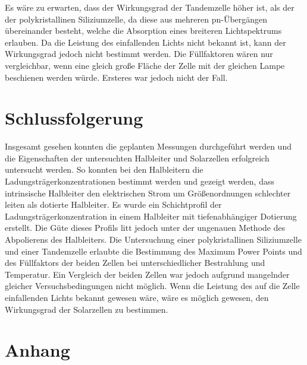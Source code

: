 \documentclass[
	a4paper,
	12pt,
	pagesize,
	ngerman
]{scrartcl}
\begin{document}
	Es wäre zu erwarten, dass der Wirkungsgrad der Tandemzelle höher ist, als der der polykristallinen Siliziumzelle, da diese aus mehreren pn-Übergängen übereinander besteht, welche die Absorption eines breiteren Lichtspektrums erlauben.
	Da die Leistung des einfallenden Lichts nicht bekannt ist, kann der Wirkungsgrad jedoch nicht bestimmt werden.
	Die Füllfaktoren wären nur vergleichbar, wenn eine gleich große Fläche der Zelle mit der gleichen Lampe beschienen werden würde.
	Ersteres war jedoch nicht der Fall.



	\section{Schlussfolgerung}
	Insgesamt gesehen konnten die geplanten Messungen durchgeführt werden und die Eigenschaften der untersuchten Halbleiter und Solarzellen erfolgreich untersucht werden.
	So konnten bei den Halbleitern die Ladungsträgerkonzentrationen bestimmt werden und gezeigt werden, dass intrinsische Halbleiter den elektrischen Strom um Größenordnungen schlechter leiten als dotierte Halbleiter.
	Es wurde ein Schichtprofil der Ladungsträgerkonzentration in einem Halbleiter mit tiefenabhängiger Dotierung erstellt.
	Die Güte dieses Profils litt jedoch unter der ungenauen Methode des Abpolierens des Halbleiters.
	Die Untersuchung einer polykristallinen Siliziumzelle und einer Tandemzelle erlaubte die Bestimmung des Maximum Power Points und des Füllfaktors der beiden Zellen bei unterschiedlicher Bestrahlung und Temperatur.
	Ein Vergleich der beiden Zellen war jedoch aufgrund mangelnder gleicher Versuchsbedingungen nicht möglich.
	Wenn die Leistung des auf die Zelle einfallenden Lichts bekannt gewesen wäre, wäre es möglich gewesen, den Wirkungsgrad der Solarzellen zu bestimmen.

	\printbibliography


	\section{Anhang} \label{s_anhang}
\end{document}
